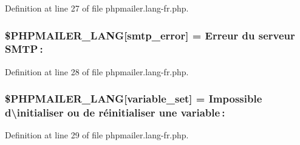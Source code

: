 Definition at line 27 of file phpmailer.\+lang-\/fr.\+php.

\subsubsection[{\texorpdfstring{\$\+P\+H\+P\+M\+A\+I\+L\+E\+R\+\_\+\+L\+A\+NG}{$PHPMAILER_LANG}}]{\setlength{\rightskip}{0pt plus 5cm}\$P\+H\+P\+M\+A\+I\+L\+E\+R\+\_\+\+L\+A\+NG\mbox{[}\textquotesingle{}smtp\+\_\+error\textquotesingle{}\mbox{]} = \textquotesingle{}Erreur du serveur S\+M\+T\+P \+: \textquotesingle{}}\hypertarget{phpmailer_8lang-fr_8php_a7d9cffba1e669c845f8a4c891ee50064}{}\label{phpmailer_8lang-fr_8php_a7d9cffba1e669c845f8a4c891ee50064}


Definition at line 28 of file phpmailer.\+lang-\/fr.\+php.

\subsubsection[{\texorpdfstring{\$\+P\+H\+P\+M\+A\+I\+L\+E\+R\+\_\+\+L\+A\+NG}{$PHPMAILER_LANG}}]{\setlength{\rightskip}{0pt plus 5cm}\$P\+H\+P\+M\+A\+I\+L\+E\+R\+\_\+\+L\+A\+NG\mbox{[}\textquotesingle{}variable\+\_\+set\textquotesingle{}\mbox{]} = \textquotesingle{}Impossible d\textbackslash{}\textquotesingle{}initialiser ou de réinitialiser une variable \+: \textquotesingle{}}\hypertarget{phpmailer_8lang-fr_8php_af795debc7a739d038742691c358d9032}{}\label{phpmailer_8lang-fr_8php_af795debc7a739d038742691c358d9032}


Definition at line 29 of file phpmailer.\+lang-\/fr.\+php.

